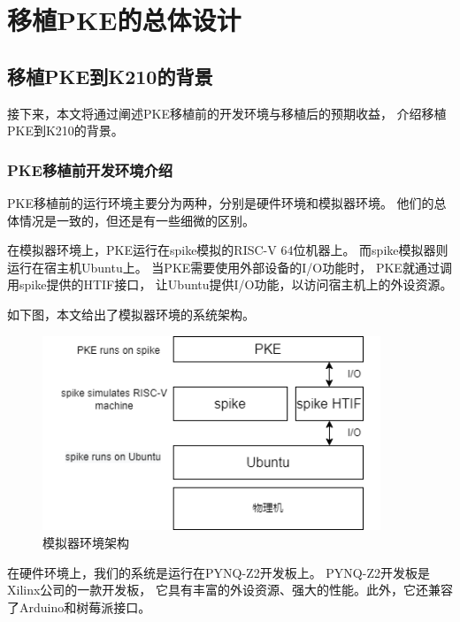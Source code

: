
\chapter{移植PKE的总体设计}

\section{移植PKE到K210的背景}

接下来，本文将通过阐述PKE移植前的开发环境与移植后的预期收益，
介绍移植PKE到K210的背景。

\subsection{PKE移植前开发环境介绍}

PKE移植前的运行环境主要分为两种，分别是硬件环境和模拟器环境。
他们的总体情况是一致的，但还是有一些细微的区别。

在模拟器环境上，PKE运行在spike模拟的RISC-V 64位机器上。
而spike模拟器则运行在宿主机Ubuntu上。
当PKE需要使用外部设备的I/O功能时，
PKE就通过调用spike提供的HTIF接口，
让Ubuntu提供I/O功能，以访问宿主机上的外设资源。

如下图，本文给出了模拟器环境的系统架构。

\begin{figure}[htbp]
    \vspace{13pt} %
    \centering
    \includegraphics[width=0.9\textwidth]{images/spike_structure.png}
    \caption{模拟器环境架构}\label{模拟器环境架构} %
\end{figure}

在硬件环境上，我们的系统是运行在PYNQ-Z2开发板上。
PYNQ-Z2开发板是Xilinx公司的一款开发板，
它具有丰富的外设资源、强大的性能。此外，它还兼容了Arduino和树莓派接口。

